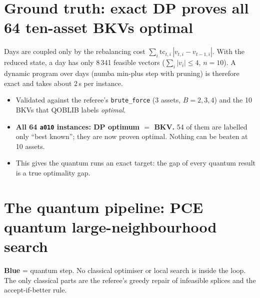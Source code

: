 \documentclass[11pt]{article}
\begin{document}
\section{Ground truth: exact DP proves all 64 ten-asset BKVs optimal}
Days are coupled only by the rebalancing cost $\sum_i \mathrm{tc}_{t,i}\,|v_{t,i}-v_{t-1,i}|$. With
the reduced state, a day has only 8\,341 feasible vectors ($\sum_i|v_i|\le4$, $n=10$). A dynamic
program over days (numba min-plus step with pruning) is therefore exact and takes about 2\,s per instance.
\begin{itemize}
\item Validated against the referee's \texttt{brute\_force} (3 assets, $B=2,3,4$) and the 10 BKVs that
  QOBLIB labels \emph{optimal}.
\item \textbf{All 64 \texttt{a010} instances: DP optimum $=$ BKV.} 54 of them are labelled only
  ``best known''; they are now proven optimal. Nothing can be beaten at 10 assets.
\item This gives the quantum runs an exact target: the gap of every quantum result is a true optimality gap.
\end{itemize}

\section{The quantum pipeline: PCE quantum large-neighbourhood search}
\begin{center}
\end{center}
\noindent\textcolor{arc}{\textbf{Blue}} = quantum step. No classical optimiser or local search is
inside the loop. The only classical parts are the referee's greedy repair of infeasible splices and the
accept-if-better rule.
\end{document}
